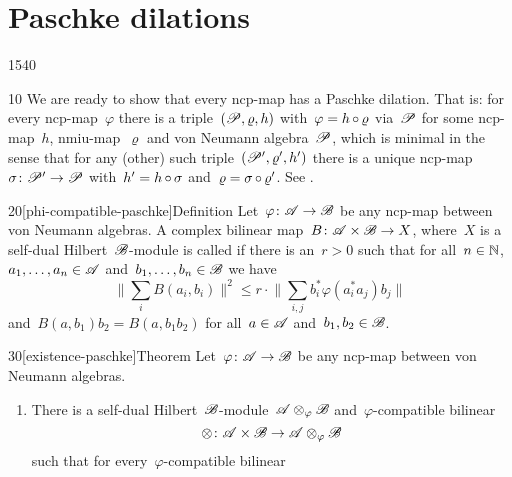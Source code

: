 \section{Paschke dilations}
\begin{parsec}{1540}%
\begin{point}{10}%
We are ready to show that every ncp-map has a Paschke dilation.
    That is: for every ncp-map~$\varphi$
        there is a triple~$(\mathscr{P}, \varrho, h)$
        with~$\varphi = h \mathop{\circ} \varrho$ via~$\mathscr{P}$
            for some ncp-map~$h$, nmiu-map~$\varrho$ and von Neumann algebra~$\mathscr{P}$,
            which is minimal in the sense
            that for any (other) such triple~$(\mathscr{P}', \varrho', h')$
            there is a unique ncp-map~$\sigma\colon \mathscr{P}' \to \mathscr{P}$
            with~$h' =h \mathop{\circ} \sigma$ and~$\varrho=\sigma\mathop{\circ}\varrho'$.
    See .
\end{point}
\begin{point}{20}[phi-compatible-paschke]{Definition}%
    Let~$\varphi\colon \mathscr{A} \to \mathscr{B}$ be any ncp-map between
        von Neumann algebras.
    A complex bilinear map~$B \colon \mathscr{A} \times \mathscr{B} \to X$,
        where~$X$ is a self-dual Hilbert~$\mathscr{B}$-module is
        called 
        if there is an~$r > 0$
        such that for all~$n\in \mathbb{N}$, $a_1, \ldots, a_n \in \mathscr{A}$
        and~$b_1, \ldots, b_n \in \mathscr{B}$ we have
        \begin{equation}
            \bigl\| \sum_i B(a_i,b_i)\bigr\|^2
                \leq r \cdot \bigl\| \sum_{i,j} b_i^* \varphi(a_i^*a_j)b_j
                \bigr\| \label{phi-compatible}
        \end{equation}
        and~$B(a,b_1)b_2 = B(a,b_1b_2)$
        for all~$a \in \mathscr{A}$ and~$b_1,b_2 \in \mathscr{B}$.
\end{point}
\begin{point}{30}[existence-paschke]{Theorem}%
    Let~$\varphi\colon \mathscr{A} \to \mathscr{B}$ be any ncp-map between
        von Neumann algebras.
\begin{enumerate}
    \item There is a self-dual Hilbert~$\mathscr{B}$-module~$\mathscr{A} \otimes_\varphi
            \mathscr{B}$ and~$\varphi$-compatible bilinear
    \begin{equation*}
        \otimes \colon \mathscr{A} \times \mathscr{B} \to \mathscr{A} \otimes_\varphi \mathscr{B}
    \end{equation*}
    such that for every~$\varphi$-compatible bilinear

\end{enumerate}
\end{point}
\end{parsec}
